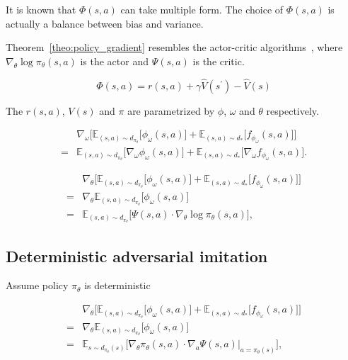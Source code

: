 It is known that $\Phi(s, a)$ can take multiple form. 
The choice of $\Phi(s, a)$ is actually a balance between bias and variance. 

Theorem~\ref{theo:policy_gradient} resembles the actor-critic algorithms~\citep{konda2000actor}, where $\nabla_{\theta}\log\pi_{\theta}(s, a)$ is the actor and $\Psi(s, a)$ is the critic. 

\begin{equation}
\Phi(s, a) = r(s, a) + \gamma \hat{V}(s^\prime) - \hat{V}(s)
\end{equation}

The $r(s, a)$, $V(s)$ and $\pi$ are parametrized by $\phi$, $\omega$ and $\theta$ respectively. 

\begin{align*}
& \nabla_{\omega} \Big[ \mathbb{E}_{(s, a)\sim d_{\pi_{\theta}}} \big[ \phi_{\omega}(s, a) \big] + \mathbb{E}_{(s, a)\sim d_*} \big[ f_{\phi_{\omega}}(s, a) \big] \Big] \\
= & \mathbb{E}_{(s, a)\sim d_{\pi_{\theta}}} \big[ \nabla_{\omega} \phi_{\omega}(s, a) \big] + \mathbb{E}_{(s, a)\sim d_*} \big[ \nabla_{\omega} f_{\phi_{\omega}}(s, a) \big].
\end{align*}

\begin{align*}
& \nabla_{\theta} \Big[ \mathbb{E}_{(s, a)\sim d_{\pi_{\theta}}} \big[ \phi_{\omega}(s, a) \big] + \mathbb{E}_{(s, a)\sim d_*} \big[ f_{\phi_{\omega}}(s, a) \big] \Big] \\
= & \nabla_{\theta} \mathbb{E}_{(s, a)\sim d_{\pi_{\theta}}} \big[ \phi_{\omega}(s, a) \big] \\ 
= & \mathbb{E}_{(s, a)\sim d_{\pi_{\theta}}} \big[ \Psi(s, a) \cdot \nabla_\theta \log \pi_{\theta}(s, a) \big], 
\end{align*}

\subsection{Deterministic adversarial imitation}
Assume policy $\pi_{\theta}$ is deterministic

\begin{align*}
& \nabla_{\theta} \Big[ \mathbb{E}_{(s, a)\sim d_{\pi_{\theta}}} \big[ \phi_{\omega}(s, a) \big] + \mathbb{E}_{(s, a)\sim d_*} \big[ f_{\phi_{\omega}}(s, a) \big] \Big] \\
= & \nabla_{\theta} \mathbb{E}_{(s, a)\sim d_{\pi_{\theta}}} \big[ \phi_{\omega}(s, a) \big] \\ 
= & \mathbb{E}_{s\sim d_{\pi_{\theta}}(s)} \big[  \nabla_\theta \pi_{\theta}(s, a) \cdot \nabla_a \Psi(s, a)\big|_{a=\pi_{\theta}(s)}\big], 
\end{align*}

